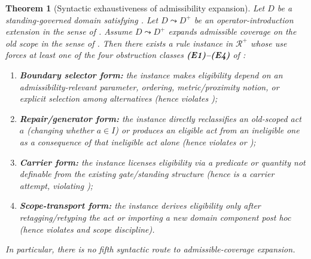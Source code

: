 \documentclass[11pt]{article}
\newtheorem{theorem}{Theorem}[section]
\theoremstyle{definition}
\begin{document}
\begin{theorem}[Syntactic exhaustiveness of admissibility expansion]
\label{thm:syntactic-exhaustion}
Let $D$ be a standing-governed domain satisfying .
Let $D\leadsto D^+$ be an operator-introduction extension in the sense of .
Assume $D\leadsto D^+$ expands admissible coverage on the old scope in the sense of .
Then there exists a rule instance in $\mathcal{R}^+$ whose use forces at least one of the four obstruction classes \textbf{(E1)--(E4)} of :
\begin{enumerate}[label=\textbf{(S\arabic*)}, leftmargin=2.8em]
\item \textbf{Boundary selector form:} the instance makes eligibility depend on an admissibility-relevant parameter, ordering, metric/proximity notion, or explicit selection among alternatives (hence violates );
\item \textbf{Repair/generator form:} the instance directly reclassifies an old-scoped act $a$ (changing whether $a\in I$) or produces an eligible act from an ineligible one \emph{as a consequence of that ineligible act alone} (hence violates  or );
\item \textbf{Carrier form:} the instance licenses eligibility via a predicate or quantity not definable from the existing gate/standing structure (hence is a carrier attempt, violating );
\item \textbf{Scope-transport form:} the instance derives eligibility only after retagging/retyping the act or importing a new domain component post hoc (hence violates  and scope discipline).
\end{enumerate}
In particular, there is no fifth syntactic route to admissible-coverage expansion.
\end{theorem}
\end{document}
